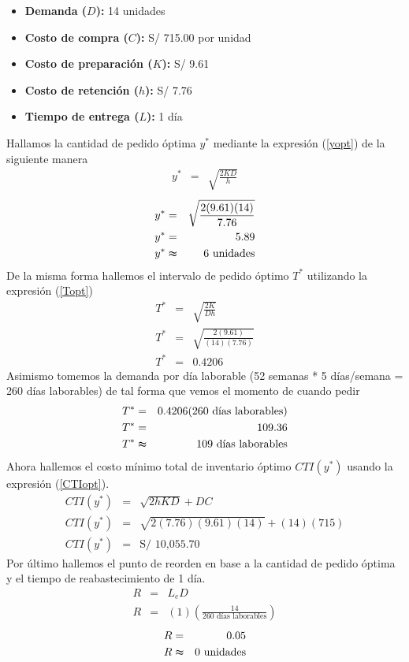 \begin{itemize}
    \item \textbf{Demanda ($D$):} 14 unidades
    \item \textbf{Costo de compra ($C$):} S/ 715.00 por unidad
    \item \textbf{Costo de preparación ($K$):} S/ 9.61
    \item \textbf{Costo de retención ($h$):} S/ 7.76
    \item \textbf{Tiempo de entrega ($L$):} 1 día
\end{itemize}

Hallamos la cantidad de pedido óptima $y^*$ mediante la expresión (\ref{yopt}) de la siguiente manera
\begin{eqnarray}
    y^* &=& \sqrt{\frac{2KD}{h}} \nonumber
\end{eqnarray}
\begin{eqnarray}
    y^* &=& \sqrt{\frac{2(9.61)(14)}{7.76}} \nonumber \\
    y^* &=& 5.89 \nonumber \\
    y^* &\thickapprox& 6 \text{ unidades} \nonumber
\end{eqnarray}
De la misma forma hallemos el intervalo de pedido óptimo $T^*$ utilizando la expresión (\ref{Topt}) 
\begin{eqnarray}
    T^* &=& \sqrt{\frac{2K}{Dh}} \nonumber \\
    T^* &=& \sqrt{\frac{2(9.61)}{(14)(7.76)}} \nonumber \\
    T^* &=& 0.4206 \nonumber
\end{eqnarray}
Asimismo tomemos la demanda por día laborable (52 semanas * 5 días/semana = 260 días laborables) de tal forma que vemos el momento de cuando pedir
\begin{eqnarray}
    T^* &=& 0.4206 (260 \text{ días laborables}) \nonumber \\   
    T^* &=& 109.36 \nonumber \\
    T^* &\thickapprox& 109 \text{ días laborables} \nonumber
\end{eqnarray}
Ahora hallemos el costo mínimo total de inventario óptimo $CTI(y^*)$ usando la expresión (\ref{CTIopt}).
\begin{eqnarray}
    CTI(y^*) &=& \sqrt{2hKD} + DC \nonumber \\
    CTI(y^*) &=& \sqrt{2(7.76)(9.61)(14)} + (14)(715) \nonumber \\
    CTI(y^*) &=& \text{S/ 10,055.70} \nonumber
\end{eqnarray}
Por último hallemos el punto de reorden en base a la cantidad de pedido óptima y el tiempo de reabastecimiento de 1 día.
\begin{eqnarray}
    R &=& L_e D \nonumber \\
    R &=& (1) \left(\frac{14}{260 \text{ días laborables}} \right) \nonumber
\end{eqnarray}
\begin{eqnarray}
    R &=& 0.05 \nonumber \\
    R &\thickapprox& 0 \text{ unidades} \nonumber
\end{eqnarray}

